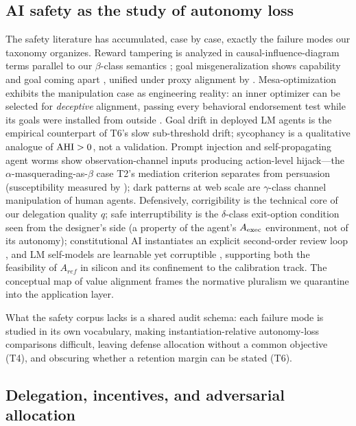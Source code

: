 \subsection{AI safety as the study of autonomy loss}\label{rw:safety}

The safety literature has accumulated, case by case, exactly the failure
modes our taxonomy organizes. Reward tampering is analyzed in
causal-influence-diagram terms parallel to our $\beta$-class semantics
\citep{amodei2016,pan2022,everitt2021}; goal misgeneralization shows capability
and goal coming apart \citep{langosco2022,shah2022}, unified under proxy
alignment by \citet{ngo2022}. Mesa-optimization exhibits the manipulation case
as engineering reality: an inner optimizer can be selected for \emph{deceptive}
alignment, passing every behavioral endorsement test while its goals were
installed from outside \citep{hubinger2019}. Goal drift in deployed LM agents
\citep{arike2025} is the empirical counterpart of T6's slow sub-threshold
drift; sycophancy \citep{sharma2023} is a qualitative analogue of $\mathrm{AHI}>0$,
not a validation. Prompt injection \citep{greshake2023} and self-propagating
agent worms \citep{cohen2024} show observation-channel inputs producing
action-level hijack---the $\alpha$-masquerading-as-$\beta$ case T2's mediation
criterion separates from persuasion (susceptibility measured by
\citealp{andriushchenko2024}); dark patterns at web scale \citep{nouwens2020}
are $\gamma$-class channel manipulation of human agents. Defensively,
corrigibility \citep{soares2015} is the technical core of our delegation
quality $q$; safe interruptibility \citep{orseau2016} is the $\delta$-class
exit-option condition seen from the designer's side (a property of the
agent's $A_{\mathrm{exec}}$ environment, not of its autonomy); constitutional AI
instantiates an explicit second-order review loop \citep{bai2022}, and LM
self-models are learnable yet corruptible \citep{binder2024}, supporting both
the feasibility of $A_{ref}$ in silicon and its confinement to the calibration
track. The conceptual map of value alignment \citep{gabriel2020} frames the
normative pluralism we quarantine into the application layer.

What the safety corpus lacks is a shared audit schema: each failure mode is
studied in its own vocabulary, making instantiation-relative autonomy-loss
comparisons difficult, leaving defense allocation without a common objective
(T4), and obscuring whether a retention margin can be stated (T6).

\subsection{Delegation, incentives, and adversarial allocation}\label{rw:delegation}

